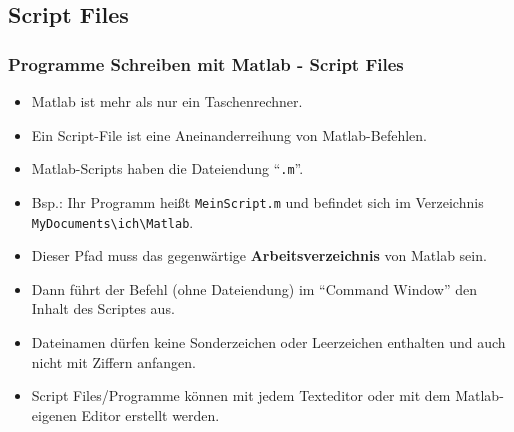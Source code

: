     \subsection{Script Files}
    \begin{frame}
        \frametitle{Programme Schreiben mit Matlab - Script Files}
        \begin{itemize}
            \item Matlab ist mehr als nur ein Taschenrechner.
            \item Ein Script-File ist eine Aneinanderreihung von Matlab-Befehlen.
            \item Matlab-Scripts haben die Dateiendung ``\texttt{.m}''.
            \item Bsp.: Ihr Programm heißt \texttt{MeinScript.m} und befindet sich im Verzeichnis \texttt{MyDocuments\textbackslash ich\textbackslash Matlab}.
            \item Dieser Pfad muss das gegenwärtige \textbf{Arbeitsverzeichnis} von Matlab sein.
            \item Dann führt der Befehl  (ohne Dateiendung) im ``Command Window'' den Inhalt des Scriptes aus.
            \item Dateinamen dürfen keine Sonderzeichen oder Leerzeichen enthalten und auch nicht mit Ziffern anfangen.
            \item Script Files/Programme können mit jedem Texteditor oder mit dem Matlab-eigenen Editor erstellt werden.
          \end{itemize}
      \end{frame}

